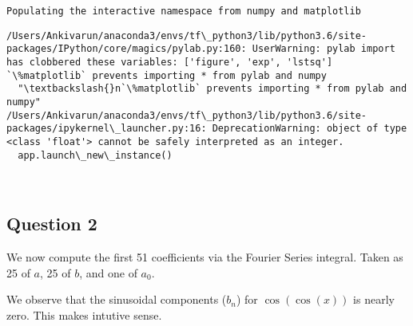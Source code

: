 \documentclass[11pt]{article}
\begin{document}
    \begin{Verbatim}[commandchars=\\\{\}]
Populating the interactive namespace from numpy and matplotlib

    \end{Verbatim}

    \begin{Verbatim}[commandchars=\\\{\}]
/Users/Ankivarun/anaconda3/envs/tf\_python3/lib/python3.6/site-packages/IPython/core/magics/pylab.py:160: UserWarning: pylab import has clobbered these variables: ['figure', 'exp', 'lstsq']
`\%matplotlib` prevents importing * from pylab and numpy
  "\textbackslash{}n`\%matplotlib` prevents importing * from pylab and numpy"
/Users/Ankivarun/anaconda3/envs/tf\_python3/lib/python3.6/site-packages/ipykernel\_launcher.py:16: DeprecationWarning: object of type <class 'float'> cannot be safely interpreted as an integer.
  app.launch\_new\_instance()

    \end{Verbatim}

    \begin{center}
    \end{center}
    { \hspace*{\fill} \\}
    
    \hypertarget{question-2}{%
\subsection{Question 2}\label{question-2}}

We now compute the first 51 coefficients via the Fourier Series
integral. Taken as 25 of \(a\), 25 of \(b\), and one of \(a_0\).

We observe that the sinusoidal components (\(b_n\)) for
\(\cos{(\cos{(x)})}\) is nearly zero. This makes intutive sense.
\end{document}
